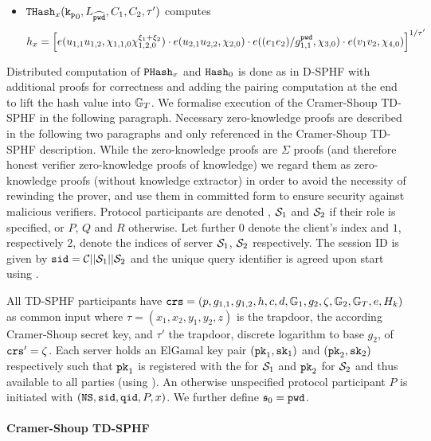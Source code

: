 \begin{itemize}
	\item $\mathtt{THash}_x(\mathtt{k_p}_0, L_{\widehat{\mathtt{pwd}}}, C_1, C_2,\tau')$ computes 
    	\[h_x=\left[ e(u_{1,1} u_{1,2}, \chi_{1,1,0}\chi_{1,2,0}^{\xi_1+\xi_2}) \cdot e(u_{2,1} u_{2,2}, \chi_{2,0}) \cdot e( (e_1 e_2) / g_{1,1}^{\mathtt{pwd}}, \chi_{3,0}) \cdot e( v_{1} v_2, \chi_{4,0})\right]^{1/\tau'}\]
\end{itemize}

\noindent
Distributed computation of $\mathtt{PHash}_x$ and $\mathtt{Hash}_0$ is done as in \ac{D-SPHF} with additional proofs for correctness and adding the pairing computation at the end to lift the hash value into $\mathbb{G}_T$.
We formalise execution of the Cramer-Shoup \ac{TD-SPHF} in the following paragraph.
Necessary zero-knowledge proofs are described in the following two paragraphs and only referenced in the Cramer-Shoup \ac{TD-SPHF} description.
While the zero-knowledge proofs are $\Sigma$ proofs (and therefore honest verifier zero-knowledge proofs of knowledge) we regard them as zero-knowledge proofs (without knowledge extractor) in order to avoid the necessity of rewinding the prover, and use them in committed form to ensure security against malicious verifiers.
Protocol participants are denoted \Client, $\mathcal{S}_1$ and $\mathcal{S}_2$ if their role is specified, or $P$, $Q$ and $R$ otherwise.
Let further $0$ denote the client's index and $1$, respectively $2$, denote the indices of server $\mathcal{S}_1$, $\mathcal{S}_2$ respectively.
The session ID is given by $\mathtt{sid}=\mathcal{C}||\mathcal{S}_1||\mathcal{S}_2$ and the unique query identifier \qid is agreed upon start using \Finit.

All \ac{TD-SPHF} participants have $\mathtt{crs}=(p,g_{1,1},g_{1,2},h,c,d,\mathbb{G}_1,g_{2},\zeta,\mathbb{G}_2,\mathbb{G}_T,e,H_k)$ as common input where $\tau=(x_1,x_2,y_1,y_2,z)$ is the \crs trapdoor, \ie the according Cramer-Shoup secret key, and $\tau'$ the trapdoor, \ie discrete logarithm to base $g_2$, of $\mathtt{crs}'=\zeta$.
Each server holds an ElGamal key pair $(\mathtt{pk}_1, \mathtt{sk}_1)$ and $(\mathtt{pk}_2, \mathtt{sk}_2)$ respectively such that $\mathtt{pk}_1$ is registered with the \CA for $\mathcal{S}_1$ and $\mathtt{pk}_2$ for $\mathcal{S}_2$ and thus available to all parties (using \Fca).
An otherwise unspecified protocol participant $P$ is initiated with $(\mathtt{NS}, \mathtt{sid}, \mathtt{qid}, P, x)$.
We further define $\mathfrak{s}_0=\mathtt{pwd}$.

\paragraph{Cramer-Shoup TD-SPHF}

